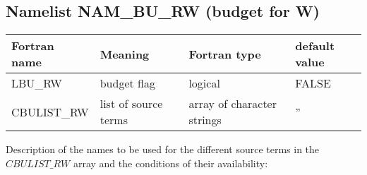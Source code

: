 \subsection{Namelist NAM\_BU\_RW (budget for W)}

\begin{longtable} {|p{}|p{}|>{\centering}p{}|p{}<{\centering}|}
\hline
Fortran name & Meaning & Fortran type & default value \\
\hline \hline
\endhead
LBU\_RW & budget flag & logical & FALSE\index{LBU\_RW!\innam{NAM\_BU\_RW}} \\\hline
CBULIST\_RW & list of source terms & array of character strings & ''\index{CBULIST\_RW!\innam{NAM\_BU\_RW}} \\\hline
\end{longtable}

Description of the names to be used for the different source terms in the $CBULIST\_RW$ array and the conditions of their availability:

